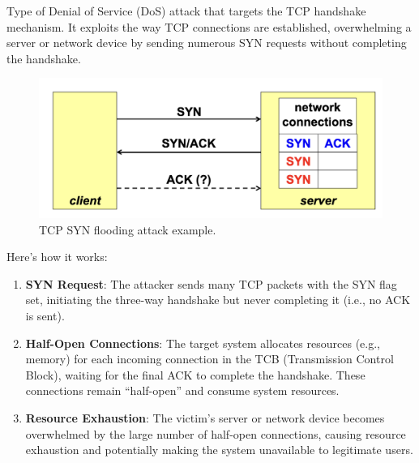 \begin{multicols}{2}
    Type of Denial of Service (DoS) attack that targets the TCP handshake mechanism. It exploits the way TCP connections are established, overwhelming a server or network device by sending numerous SYN requests without completing the handshake.

\columnbreak

    \begin{figure}[H]
        \centering
        \includegraphics[width=\linewidth]{Images/NetSec/syn_flooding.png}
        \caption{TCP SYN flooding attack example.}
    \end{figure}
\end{multicols}

Here's how it works:
\begin{enumerate}
    \item \textbf{SYN Request}: The attacker sends many TCP packets with the SYN flag set, initiating the three-way handshake but never completing it (i.e., no ACK is sent).
    \item \textbf{Half-Open Connections}: The target system allocates resources (e.g., memory) for each incoming connection in the TCB (Transmission Control Block), waiting for the final ACK to complete the handshake. These connections remain “half-open” and consume system resources.
    \item \textbf{Resource Exhaustion}: The victim’s server or network device becomes overwhelmed by the large number of half-open connections, causing resource exhaustion and potentially making the system unavailable to legitimate users.
\end{enumerate}

